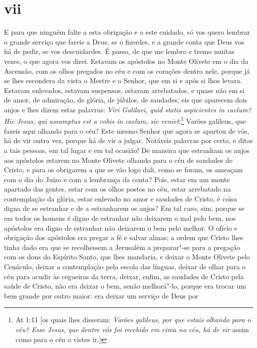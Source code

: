 \section*{vii}

E para que ninguém falte a esta obrigação e a este cuidado, só vos quero
lembrar o grande serviço que fareis a Deus, se o fizerdes, e a grande
conta que Deus vos há de pedir, se vos descuidardes. É passo, de que me
lembro e tremo muitas vezes, o que agora vos direi. Estavam os apóstolos
no Monte Olivete em o dia da Ascensão, com os olhos pregados no céu e
com os corações dentro nele, porque já se lhes escondera da vista o
Mestre e o Senhor, que em si e após
si lhos levara. Estavam enlevados, estavam suspensos, estavam
arrebatados, e quase não em si de amor, de admiração, de glória, de
júbilos, de saudades; eis que aparecem dois anjos e lhes dizem estas
palavras: \emph{Viri Galilaei, quid statis aspicientes in caelum? Hic
Jesus, qui assumptus est a vobis in caelum, sic veniet}:\footnote{At 1:11 [os quais lhes disseram: \emph{Varões galileus, por que estais olhando para o céu? Esse Jesus, que
dentre vós foi recebido em cima no céu, há de vir} assim como para o céu o vistes ir.]} Varões
galileus, que fazeis aqui olhando para o céu? Este mesmo Senhor que
agora se apartou de vós, há de vir outra vez, porque há de vir a julgar.
Notáveis palavras por certo, e ditas a tais pessoas, em tal lugar e
em tal ocasião! De maneira que estranham os anjos aos apóstolos estarem
no Monte Olivete olhando para o céu de saudades de Cristo, e para os
obrigarem a que se vão logo dali, como se foram, os ameaçam com o
dia do Juízo e com a lembrança da conta? Pois, estar em um monte
apartado das gentes, estar com os olhos postos no céu, estar arrebatado
na contemplação da glória, estar enlevado no amor e saudades de Cristo,
é coisa digna de se estranhar e de a estranharem os anjos? Em tal caso,
sim, porque se em todos os homens é digno de estranhar não deixarem o
mal pelo bem, nos apóstolos era digno de estranhar não deixarem o bem
pelo melhor. O ofício e obrigação dos apóstolos era pregar a fé e salvar
almas; a ordem que Cristo lhes tinha dado era que se recolhessem a
Jerusalém a preparar"-se para a pregação com os dons do Espírito Santo,
que lhes mandaria, e deixar o Monte Olivete pelo Cenáculo, deixar a
contemplação pela escola das línguas, deixar de olhar para o céu para
acudir às cegueiras da terra, deixar, enfim, as saudades de Cristo pela
saúde de Cristo, não era deixar o bem, senão melhorá"-lo, porque era
trocar um bem grande por outro maior: era deixar um serviço de Deus por
